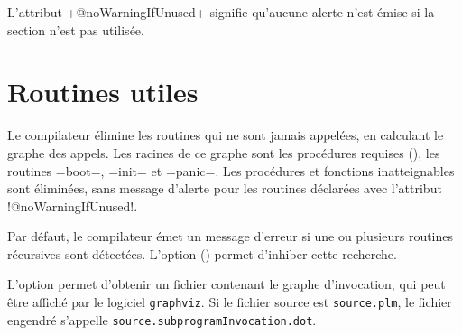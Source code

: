 
L'attribut \plm+@noWarningIfUnused+ signifie qu'aucune alerte n'est émise si la section n'est pas utilisée.









\section{Routines utiles}

Le compilateur élimine les routines qui ne sont jamais appelées, en calculant le graphe des appels. Les racines de ce graphe sont les procédures requises (), les routines \plm=boot=, \plm=init= et \plm=panic=. Les procédures et fonctions inatteignables sont éliminées, sans message d'alerte pour les routines déclarées avec l'attribut \plm!@noWarningIfUnused!.












Par défaut, le compilateur émet un message d'erreur si une ou plusieurs routines récursives sont détectées. L'option  () permet d'inhiber cette recherche.

L'option  permet d'obtenir un fichier contenant le graphe d'invocation, qui peut être affiché par le logiciel \texttt{graphviz}. Si le fichier source est \texttt{source.plm}, le fichier engendré s'appelle \texttt{source.subprogramInvocation.dot}.

